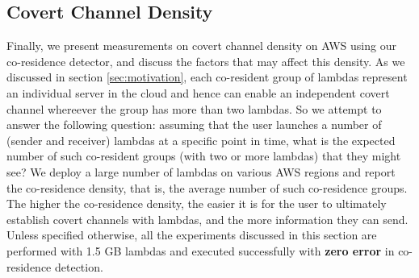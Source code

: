 \subsection{Covert Channel Density}
Finally, we present measurements on covert channel density on AWS using our
co-residence detector, and discuss the factors that may affect this density.  As
we discussed in section \ref{sec:motivation}, each co-resident group of lambdas 
represent an individual server in the cloud and hence can enable an independent 
covert channel whereever the group has more than two lambdas. So we attempt to answer 
the following question: assuming that the user launches a number of
(sender and receiver) lambdas at a specific point in time, what is the expected
number of such co-resident groups (with two or more lambdas) that they might see? 
We deploy a large number of lambdas on various AWS regions and report the co-residence 
density, that is, the average number of such co-residence groups. The higher the 
co-residence density, the easier it is for the user
to ultimately establish covert channels with lambdas, and the more information
they can send. Unless specified otherwise, all the experiments discussed in this
section are performed with 1.5 GB lambdas and executed successfully with
\textbf{zero error} in co-residence detection.



